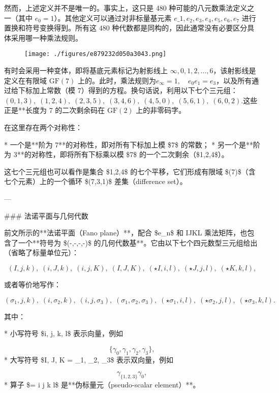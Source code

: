 然而，上述定义并不是唯一的。事实上，这只是 480 种可能的八元数乘法定义之一（其中 $e_{0} = 1$）。其他定义可以通过对非标量基元素 ${ e\_{1}, e_{2}, e_{3}, e_{4}, e_{5}, e_{6}, e_{7} }$ 进行置换和符号变换得到。所有这 $480$ 种代数都是同构的，因此通常没有必要区分具体采用哪一种乘法规则。
\begin{figure}[ht]
\centering
\texttt{[image: ./figures/e879232d050a3043.png]}
\caption{} \label{fig_BaYs_2}
\end{figure}
有时会采用一种变体，即将基底元素标记为射影线上 ${\infty, 0, 1, 2, \ldots, 6}$，该射影线是定义在有限域 $\mathrm{GF}(7)$ 上的。此时，乘法规则为$e_{\infty} = 1, \quad e_{0} e_{1} = e_{3}$，以及所有通过给下标加上常数（模 7）得到的方程。换句话说，利用以下七个三元组：$(0,1,3), \; (1,2,4), \; (2,3,5), \; (3,4,6), \; (4,5,0), \; (5,6,1), \; (6,0,2)$.这些正是**长度为 7 的二次剩余码在 $\mathrm{GF}(2)$ 上的非零码字。

在这里存在两个对称性：

* 一个是**阶为 7**的对称性，即对所有下标加上模 \$7\$ 的常数；
* 另一个是**阶为 3**的对称性，即将所有下标乘以模 \$7\$ 的一个二次剩余（\$1,2,4\$）。

这七个三元组也可以看作是集合 \${1,2,4}\$ 的七个平移，它们形成有限域 \$(7)\$（含七个元素）上的一个循环 \$(7,3,1)\$ 差集（difference set）。

---

### 法诺平面与几何代数

前文所示的**法诺平面（Fano plane）**，配合 \$e\_{n}\$ 和 IJKL 乘法矩阵，也包含了一个**符号为 \$(-,-,-,-)\$ 的几何代数基**。它由以下七个四元数型三元组给出（省略了标量单位元）：

$$
(I, j, k), \; (i, J, k), \; (i, j, K), \; (I, J, K), \; (\star I, i, l), \; (\star J, j, l), \; (\star K, k, l),
$$

或者等价地写作：

$$
(\sigma_{1}, j, k), \; (i, \sigma_{2}, k), \; (i, j, \sigma_{3}), \; (\sigma_{1}, \sigma_{2}, \sigma_{3}), \; 
(\star \sigma_{1}, i, l), \; (\star \sigma_{2}, j, l), \; (\star \sigma_{3}, k, l).
$$

其中：

* 小写符号 \${i, j, k, l}\$ 表示向量，例如

  $$
  \{\gamma_{0}, \gamma_{1}, \gamma_{2}, \gamma_{3}\},
  $$
* 大写符号 \${I, J, K} = {\sigma\_{1}, \sigma\_{2}, \sigma\_{3}}\$ 表示双向量，例如

  $$
  \gamma_{\{1,2,3\}} \gamma_{0},
  $$
* 算子 \$\star = i j k l\$ 是**伪标量元（pseudo-scalar element）**。

